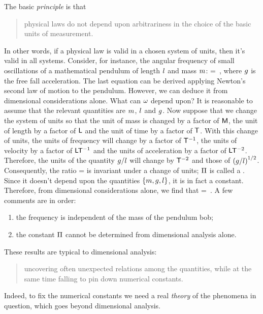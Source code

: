 The basic \emph{principle} is that
\begin{quote}
physical laws do not depend upon arbitrariness in the choice of the basic units of measurement.
\end{quote}
In other words, if a physical law is valid in a chosen system of units, then it's valid in all systems. Consider, for instance, the angular frequency of small oscillations of a mathematical pendulum of length $l$ and mass $m$:
\beq
\angfreq = \sqrt{\dfrac{\grav}{\length}}\,,
\eeq
where $g$ is the free fall acceleration. The last equation can be derived applying Newton's second law of motion to the pendulum. However, we can deduce it from dimensional considerations alone. What can $\omega$ depend upon? It is reasonable to assume that the relevant quantities are $m$, $l$ and $g$. Now suppose that we change the system of units so that the unit of mass is changed by a factor of $\mathsf{M}$, the unit of length by a factor of $\mathsf{L}$ and the unit of time by a factor of $\mathsf{T}$. With this change of units, the units of frequency will change by a factor of $\mathsf{T}^{-1}$, the units of velocity by a factor of $\mathsf{L}\mathsf{T}^{-1}$ and the units of acceleration by a factor of $\mathsf{L}\mathsf{T}^{-2}$. Therefore, the units of the quantity $g/l$ will change by $\mathsf{T}^{-2}$ and those of $\left(g/l\right)^{1/2}$. Consequently, the ratio
\beq
\kdim = \dfrac{\angfreq}{\sqrt{\grav/\length}}
\eeq
is invariant under a change of units; $\Pi$ is called a . Since it doesn't depend upon the quantities $\left\lbrace{m, g, l}\right\rbrace$, it is in fact a constant. Therefore, from dimensional considerations alone, we find that
\beq
\angfreq = \kdim\sqrt{\dfrac{\grav}{\length}}\,.
\eeq
A few comments are in order:
\begin{enumerate}
\item the frequency is independent of the mass of the pendulum bob;
\item the constant $\Pi$ cannot be determined from dimensional analysis alone.
\end{enumerate}
These results are typical to dimensional analysis:
\begin{quote}
uncovering often unexpected relations among the quantities, while at the same time falling to pin down numerical constants.
\end{quote}
Indeed, to fix the numerical constants we need a real \emph{theory} of the phenomena in question, which goes beyond dimensional analysis.


